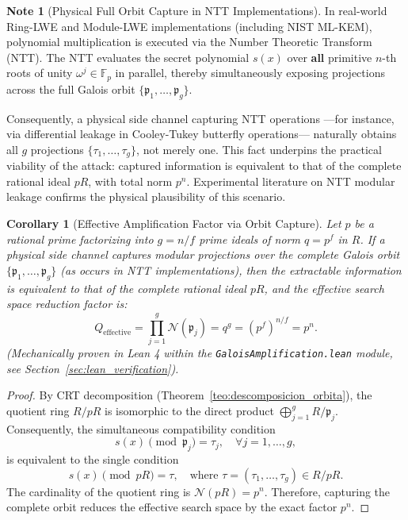 \documentclass[11pt,a4paper]{article}
\theoremstyle{plain}
\newtheorem{corolario}[teorema]{Corollary}
\theoremstyle{definition}
\newtheorem{remark}[teorema]{Note}
\numberwithin{equation}{section}
\newcommand{\FF}{\mathbb{F}}
\newcommand{\cN}{\mathcal{N}}
\newcommand{\fkp}{\mathfrak{p}}
\begin{document}
\begin{remark}[Physical Full Orbit Capture in NTT Implementations]
\label{rem:captura_ntt}
In real-world Ring-LWE and Module-LWE implementations (including NIST ML-KEM), polynomial multiplication is executed via the Number Theoretic Transform (NTT). The NTT evaluates the secret polynomial $s(x)$ over \textbf{all} primitive $n$-th roots of unity $\omega^j \in \FF_p$ in parallel, thereby simultaneously exposing projections across the full Galois orbit $\{\fkp_1, \dots, \fkp_g\}$.

Consequently, a physical side channel capturing NTT operations —for instance, via differential leakage in Cooley-Tukey butterfly operations— naturally obtains all $g$ projections $\{\tau_1, \dots, \tau_g\}$, not merely one. This fact underpins the practical viability of the attack: captured information is equivalent to that of the complete rational ideal $pR$, with total norm $p^n$. Experimental literature on NTT modular leakage \cite{Ravi2020,Wenger2024} confirms the physical plausibility of this scenario.
\end{remark}

\begin{corolario}[Effective Amplification Factor via Orbit Capture]
\label{cor:amplificacion_oraculo}
Let $p$ be a rational prime factorizing into $g = n/f$ prime ideals of norm $q = p^f$ in $R$. If a physical side channel captures modular projections over the complete Galois orbit $\{\fkp_1, \dots, \fkp_g\}$ (as occurs in NTT implementations), then the extractable information is equivalent to that of the complete rational ideal $pR$, and the effective search space reduction factor is:
\begin{equation}
Q_{\text{effective}} = \prod_{j=1}^{g} \cN(\fkp_j) = q^g = (p^f)^{n/f} = p^n.
\end{equation}
(Mechanically proven in Lean 4 within the \texttt{GaloisAmplification.lean} module, see Section~\ref{sec:lean_verification}).
\end{corolario}

\begin{proof}
By CRT decomposition (Theorem~\ref{teo:descomposicion_orbita}), the quotient ring $R/pR$ is isomorphic to the direct product $\bigoplus_{j=1}^g R/\fkp_j$. Consequently, the simultaneous compatibility condition
\begin{equation}
s(x) \pmod{\fkp_j} = \tau_j, \quad \forall j = 1, \dots, g,
\end{equation}
is equivalent to the single condition
\begin{equation}
s(x) \pmod{pR} = \tau, \quad \text{where } \tau = (\tau_1, \dots, \tau_g) \in R/pR.
\end{equation}
The cardinality of the quotient ring is $\cN(pR) = p^n$. Therefore, capturing the complete orbit reduces the effective search space by the exact factor $p^n$.
\end{proof}
\end{document}
